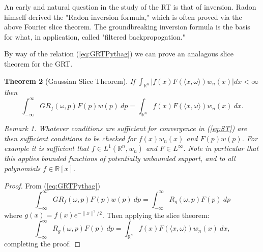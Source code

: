 \documentclass{amsart}
\newtheorem{theorem}{Theorem}[section]
\theoremstyle{remark}
\newtheorem{remark}[theorem]{Remark}
\numberwithin{equation}{section}
\newcommand{\RR}{\mathbb{R}}
\begin{document}
An early and natural question in the study of the RT is that of inversion. Radon himself derived the "Radon inversion formula," \cite{Rado17} \cite{Rado86} which is often proved via the above Fourier slice theorem. The groundbreaking inversion formula is the basis for what, in application, called "filtered backpropogation." 

By way of the relation (\ref{eq:GRTPythag}) we can prove an analagous slice theorem for the GRT. 
\begin{theorem}[Gaussian Slice Theorem] If $\int_{\mathbb{R}^n} |f(x) F(\langle x, \omega\rangle) w_n(x)| dx < \infty$ then
\begin{equation}\label{eq:GST}
    \int_{-\infty}^\infty GR_f(\omega, p)F(p) w(p) ~dp
    = \int_{\mathbb{R}^n}f(x) F(\langle x, \omega\rangle) w_n(x) ~dx. 
\end{equation}
\begin{remark}
Whatever conditions are sufficient for convergence in (\ref{eq:ST}) are then sufficient conditions to be checked for $f(x)w_n(x)$ and $F(p)w(p)$. For example it is sufficient that $f \in L^1(\RR^n, w_n)$ and $F \in L^\infty$. Note in particular that this applies bounded functions of potentially unbounded support, and to all polynomials $f \in \RR[x]$.
\end{remark}
\end{theorem}
\begin{proof}
From (\ref{eq:GRTPythag})
\[
    \int_{-\infty}^\infty GR_f(\omega, p)F(p) w(p) ~dp 
    = \int_{-\infty}^\infty R_g(\omega, p) F(p) ~dp
\]
where $g(x) = f(x)e^{-\|x\|^2/2}$. Then applying the slice theorem:
\[
    \int_{-\infty}^\infty R_g(\omega, p) F(p) ~dp 
    = \int_{\RR^n} f(x)F(\langle x, \omega \rangle) w_n(x) ~dx,
\]
completing the proof.
\end{proof}

\end{document}
